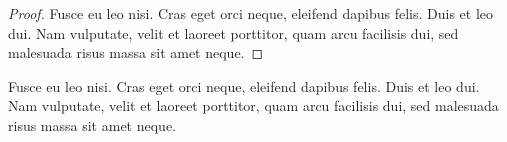 \documentclass[a4paper,ngerman]{tui-algo-seminar}
\begin{document}
\begin{proof}
Fusce eu leo nisi. Cras eget orci neque, eleifend dapibus felis. Duis et leo dui. Nam vulputate, velit et laoreet porttitor, quam arcu facilisis dui, sed malesuada risus massa sit amet neque.
\end{proof}

\begin{claimproof}
Fusce eu leo nisi. Cras eget orci neque, eleifend dapibus felis. Duis et leo dui. Nam vulputate, velit et laoreet porttitor, quam arcu facilisis dui, sed malesuada risus massa sit amet neque.
\end{claimproof}
\end{document}

